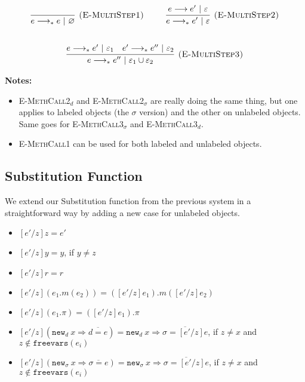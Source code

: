 \documentclass{llncs}
\newcommand{\keywadj}[1]{\mathtt{#1}}
\newcommand{\newd}[0]{
	\keywadj{new}_d~x \Rightarrow \overline{d = e}
}
\newcommand{\newsig}[0]{
	\keywadj{new}_\sigma~x \Rightarrow \overline{\sigma = e}
}
\begin{document}
\[
\begin{array}{c}

	\infer[\textsc{(E-MultiStep1)}]
	{e \longrightarrow_* e~|~\varnothing}
	{} ~~~~~~~~
	
	\infer[\textsc{(E-MultiStep2)}]
	{e \longrightarrow_* e'~|~\varepsilon}
	{e \longrightarrow e'~|~\varepsilon} \\[5ex]

	\infer[\textsc{(E-MultiStep3)}]
	{e \longrightarrow_* e''~|~\varepsilon_1 \cup \varepsilon_2}
	{e \longrightarrow_* e'~|~\varepsilon_1 & e' \longrightarrow_* e''~|~\varepsilon_2}

\end{array}
\]

\noindent \textbf{Notes:}
\begin{itemize}
	\item \textsc{E-MethCall2$_d$} and \textsc{E-MethCall2$_\sigma$} are really doing the same thing, but one applies to labeled objects (the $\sigma$ version) and the other on unlabeled objects. Same goes for \textsc{E-MethCall3$_\sigma$} and \textsc{E-MethCall3$_d$}.
	\item \textsc{E-MethCall1} can be used for both labeled and unlabeled objects.
\end{itemize}


\subsection{Substitution Function}


\noindent
We extend our Substitution function from the previous system in a straightforward way by adding a new case for unlabeled objects.

\begin{itemize}
	\item $[e'/z]z = e'$
	\item $[e'/z]y = y$, if $y \neq z$
	\item $[e'/z]r = r$
	\item $[e'/z](e_1.m(e_2)) = ([e'/z]e_1).m([e'/z]e_2)$
	\item $[e'/z](e_1.\pi) = ([e'/z]e_1).\pi$
	\item $[e'/z](\newd) = \keywadj{new}_d~x \Rightarrow \overline{ \sigma = [e'/z]e }$, if $z \neq x$ and $z \notin \keywadj{freevars}(e_i)$
	\item $[e'/z](\newsig) = \keywadj{new}_\sigma~x \Rightarrow \overline{ \sigma = [e'/z]e }$, if $z \neq x$ and $z \notin \keywadj{freevars}(e_i)$
\end{itemize}
\end{document}
